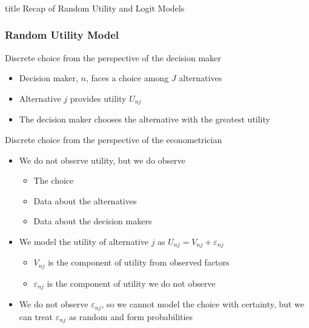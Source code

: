 \documentclass{beamer}
\begin{document}
\begin{frame}\frametitle{}
    \vfill
    \centering
    \begin{beamercolorbox}[center]{title}
        \Large Recap of Random Utility and Logit Models
    \end{beamercolorbox}
    \vfill
\end{frame}

\begin{frame}\frametitle{Random Utility Model}
	Discrete choice from the perspective of the decision maker
	\begin{itemize}
		\item Decision maker, $n$, faces a choice among $J$ alternatives
		\item Alternative $j$ provides utility $U_{nj}$
		\item The decision maker chooses the alternative with the greatest utility
	\end{itemize}
	\vspace{2ex}
	Discrete choice from the perspective of the econometrician
	\begin{itemize}
		\item We do not observe utility, but we do observe
		\begin{itemize}
			\item The choice
			\item Data about the alternatives
			\item Data about the decision makers
		\end{itemize}
		\item We model the utility of alternative $j$ as $U_{nj} = V_{nj} + \varepsilon_{nj}$
		\begin{itemize}
			\item $V_{nj}$ is the component of utility from observed factors
			\item $\varepsilon_{nj}$ is the component of utility we do not observe
		\end{itemize}
		\item We do not observe $\varepsilon_{nj}$, so we cannot model the choice with certainty, but we can treat $\varepsilon_{nj}$ as random and form probabilities
	\end{itemize}
\end{frame}
\end{document}
